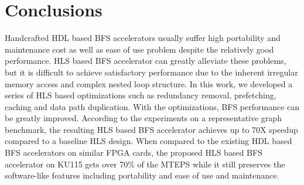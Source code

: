 \section{Conclusions} \label{sec:conclusion}
Handcrafted HDL based BFS accelerators usually suffer 
high portability and maintenance cost 
as well as ease of use problem despite the relatively 
good performance. HLS based BFS accelerator can greatly 
alleviate these problems, but it is 
difficult to achieve satisfactory performance due to 
the inherent irregular memory access and 
complex nested loop structure. In this work, we developed 
a series of HLS based optimizations such as redundancy removal, 
prefetching, caching and data path duplication. 
With the optimizations, BFS performance can be greatly improved. 
According to the experiments on 
a representative graph benchmark, the resulting HLS based BFS accelerator 
achieves up to 70X speedup compared to a baseline HLS design. 
When compared to the existing HDL based BFS accelerators on 
similar FPGA cards, the proposed HLS based BFS accelerator on KU115 
gets over 70\% of the MTEPS while it still preserves the 
software-like features including portability and ease of use 
and maintenance.  

